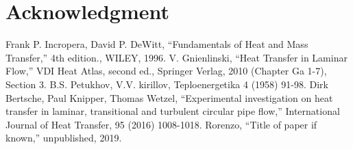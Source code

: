 \documentclass[conference]{IEEEtran}
\begin{document}
\section*{Acknowledgment}


\begin{thebibliography}{00}
  Frank P. Incropera, David P. DeWitt, ``Fundamentals of Heat and Mass Transfer,'' 4th edition., WILEY, 1996.
  V. Gnienlinski, ``Heat Transfer in Laminar Flow,'' VDI Heat Atlas, second ed., Springer Verlag, 2010 (Chapter Ga 1-7), Section 3.
  B.S. Petukhov, V.V. kirillov, Teploenergetika 4 (1958) 91-98.
  Dirk Bertsche, Paul Knipper, Thomas Wetzel, ``Experimental investigation on heat transfer in laminar, transitional and turbulent circular pipe flow,'' International Journal of Heat Transfer, 95 (2016) 1008-1018.
 Rorenzo, ``Title of paper if known,'' unpublished, 2019.

%
%

\end{thebibliography}
\end{document}
